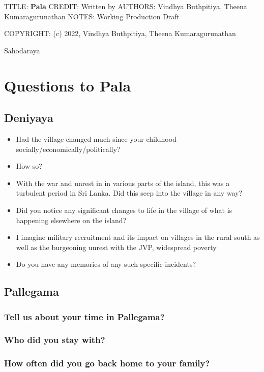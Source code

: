\documentclass[11pt]{article}
\author{theena}
\date{\today}
\title{}
\begin{document}
\tableofcontents

TITLE: \textbf{\textbf{Pala}} 
CREDIT: Written by
AUTHORS: Vindhya Buthpitiya, Theena Kumaragurunathan
NOTES: Working Production Draft

COPYRIGHT: (c) 2022, Vindhya Buthpitiya, Theena Kumaragurunathan


Sahodaraya


\section{Questions to Pala}
\label{sec:orge752f4d}

\subsection{Deniyaya}
\label{sec:org841187a}

\begin{itemize}
\item Had the village changed much since your childhood - socially/economically/politically?
\item How so?
\item With the war and unrest in in various parts of the island, this was a turbulent period in Sri Lanka. Did this seep into the village in any way?
\item Did you notice any significant changes to life in the village of what is happening elsewhere on the island?
\item I imagine military recruitment and its impact on villages in the rural south as well as the burgeoning unrest with the JVP, widespread poverty
\item Do you have any memories of any such specific incidents?
\end{itemize}

\subsection{Pallegama}
\label{sec:orgf9f50ab}

\subsubsection{Tell us about your time in Pallegama?}
\label{sec:orgdb69ca9}
\subsubsection{Who did you stay with?}
\label{sec:orge8612b1}
\subsubsection{How often did you go back home to your family?}
\label{sec:orgd1c8d4e}
\end{document}
